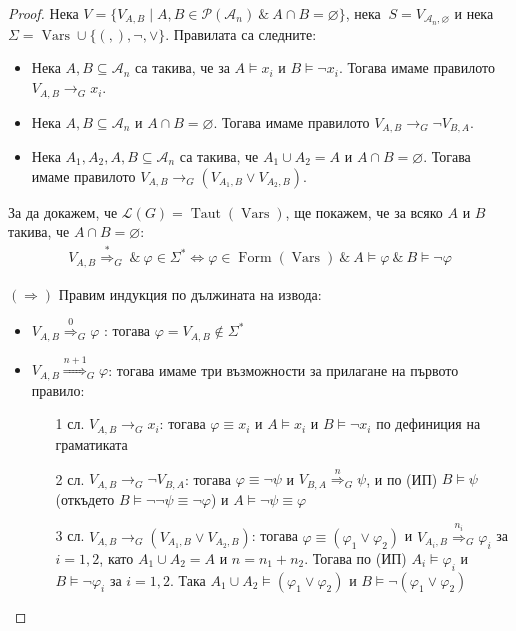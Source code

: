 \documentclass[a4paper]{article}
\newcommand{\vars}{\operatorname{Vars}}
\newcommand{\form}{\operatorname{Form}(\vars)}
\newcommand{\taut}{\operatorname{Taut}(\vars)}
\newcommand{\A}{\mathcal{A}}
\newcommand{\der}[2]{\stackrel{#1}{\Rightarrow}_{#2}}
\begin{document}
\begin{proof}
    Нека $V = \{ V_{A, B} \mid A, B \in \mathcal{P}(\A_n) \: \& \: A \cap B = \varnothing \}$, нека $\: S = V_{\A_n, \varnothing}$ и нека $\Sigma = \vars \cup \{ (, ), \neg, \lor \}$.
    Правилата са следните:

    \begin{itemize}
        \item Нека $A, B \subseteq \A_n$ са такива, че за $A \models x_i$ и $B \models \neg x_i$.
              Тогава имаме правилото $V_{A, B} \rightarrow_G x_i$.
        \item Нека $A, B \subseteq \A_n$ и $A \cap B = \varnothing$.
              Тогава имаме правилото $V_{A, B} \rightarrow_G \neg V_{B, A}$.
        \item Нека $A_1, A_2, A, B \subseteq \A_n$ са такива, че $A_1 \cup A_2 = A$ и $A \cap B = \varnothing$.
              Тогава имаме правилото $V_{A, B} \rightarrow_G ( V_{A_1, B} \lor V_{A_2, B})$.
    \end{itemize}

    За да докажем, че $\mathcal{L}(G) = \taut$, ще покажем, че за всяко $A$ и $B$ такива, че $A \cap B = \varnothing$:
    \begin{align*}
        V_{A, B} \der{*}{G} \: \& \: \varphi \in \Sigma^* \iff \varphi \in \form \: \& \: A \models \varphi \: \& \: B \models \neg \varphi
    \end{align*}

    $(\Rightarrow)$ Правим индукция по дължината на извода:

    \begin{itemize}
        \item $V_{A, B} \der{0}{G} \varphi$ : тогава $\varphi = V_{A, B} \notin \Sigma^*$
        \item $V_{A, B} \der{n + 1}{G} \varphi$: тогава имаме три възможности за прилагане на първото правило:

              \begin{itemize}
                  \item[1 сл.] $V_{A, B} \rightarrow_G x_i$: тогава $\varphi \equiv x_i$ и $A \models x_i$ и $B \models \neg x_i$ по дефиниция на граматиката
                  \item[2 сл.] $V_{A, B} \rightarrow_G \neg V_{B, A}$: тогава $\varphi \equiv \neg \psi$ и $V_{B, A} \der{n}{G} \psi$, и по (ИП) $B \models \psi$ (откъдето $B \models \neg \neg \psi \equiv \neg \varphi$) и $A \models \neg \psi \equiv \varphi$
                  \item[3 сл.] $V_{A, B} \rightarrow_G ( V_{A_1, B} \lor V_{A_2, B})$: тогава $\varphi \equiv (\varphi_1 \lor \varphi_2)$ и $V_{A_i, B} \der{n_i}{G} \varphi_i$ за $i = 1, 2$, като $A_1 \cup A_2 = A$ и $n = n_1 + n_2$.
                        Тогава по (ИП) $A_i \models \varphi_i$ и $B \models \neg \varphi_i$ за $i = 1, 2$.
                        Така $A_1 \cup A_2 \models (\varphi_1 \lor \varphi_2)$ и $B \models \neg (\varphi_1 \lor \varphi_2)$
              \end{itemize}
    \end{itemize}


\end{proof}
\end{document}
